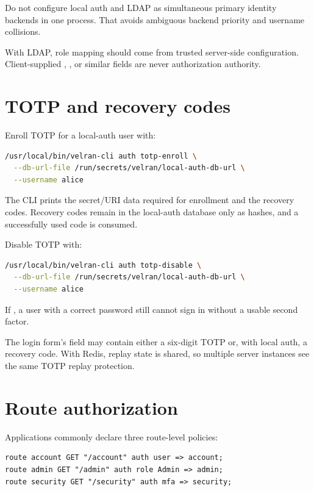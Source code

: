 Do not configure local auth and LDAP as simultaneous primary identity backends in one process. That avoids ambiguous backend priority and username collisions.

With LDAP, role mapping should come from trusted server-side configuration. Client-supplied , , or similar fields are never authorization authority.

\section{TOTP and recovery codes}

Enroll TOTP for a local-auth user with:

\begin{lstlisting}[language=bash]
/usr/local/bin/velran-cli auth totp-enroll \
  --db-url-file /run/secrets/velran/local-auth-db-url \
  --username alice
\end{lstlisting}

The CLI prints the secret/URI data required for enrollment and the recovery codes. Recovery codes remain in the local-auth database only as hashes, and a successfully used code is consumed.

Disable TOTP with:

\begin{lstlisting}[language=bash]
/usr/local/bin/velran-cli auth totp-disable \
  --db-url-file /run/secrets/velran/local-auth-db-url \
  --username alice
\end{lstlisting}

If \code{require_totp = true}, a user with a correct password still cannot sign in without a usable second factor.

The login form's  field may contain either a six-digit TOTP or, with local auth, a recovery code. With Redis, replay state is shared, so multiple server instances see the same TOTP replay protection.

\section{Route authorization}

Applications commonly declare three route-level policies:

\begin{lstlisting}[language=Velran]
route account GET "/account" auth user => account;
route admin GET "/admin" auth role Admin => admin;
route security GET "/security" auth mfa => security;
\end{lstlisting}

